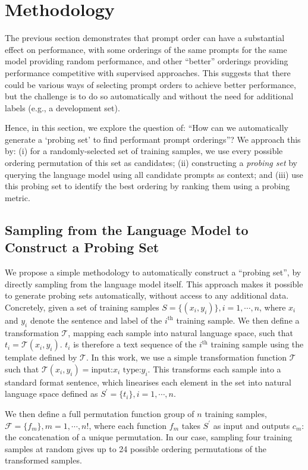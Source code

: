 \section{Methodology}

The previous section demonstrates that prompt order can have a substantial effect on performance, with some orderings of the same prompts for the same model providing random performance, and other ``better'' orderings providing performance competitive with supervised approaches. This suggests that there could be various ways of selecting prompt orders to achieve better performance, but the challenge is to do so automatically and without the need for additional labels (e.g., a development set).

Hence, in this section, we explore the question of: ``How can we automatically generate a `probing set' to find performant prompt orderings''? We approach this by: (i) for a randomly-selected set of training samples, we use every possible ordering permutation of this set as candidates; (ii) constructing a \textit{probing set} by querying the language model using all candidate prompts as context; and (iii) use this probing set to identify the best ordering by ranking them using a probing metric.
\subsection{Sampling from the Language Model to Construct a Probing Set}

We propose a simple methodology to automatically construct a ``probing set'', by directly sampling from the language model itself. This approach makes it possible to generate probing sets automatically, without access to any additional data. Concretely, given a set of training samples $S=\{(x_i, y_i)\}, i=1,\cdots,n$, where $x_i$ and $y_i$ denote the sentence and label of the $i^\text{th}$ training sample. We then define a transformation $\mathcal{T}$, mapping each sample into natural language space, such that $t_i = \mathcal{T}(x_i, y_i)$. $t_i$ is therefore a text sequence of the $i^\text{th}$ training sample using the template defined by $\mathcal{T}$.
In this work, we use a simple transformation function $\mathcal{T}$ such that $\mathcal{T}(x_i, y_i) = \text{input:}x_i \text{ type:} y_i$. This transforms each sample into a standard format sentence, which linearises each element in the set into natural language space defined as $S^{'}=\{t_i\}, i=1,\cdots,n$.

We then define a full permutation function group of $n$ training samples, $\mathcal{F} = \{f_m\}, m=1,\cdots, n!$, where each function $f_m$ takes $S^{'}$ as input and outputs $c_m$: the concatenation of a unique permutation. In our case, sampling four training samples at random gives up to 24 possible ordering permutations of the transformed samples.

